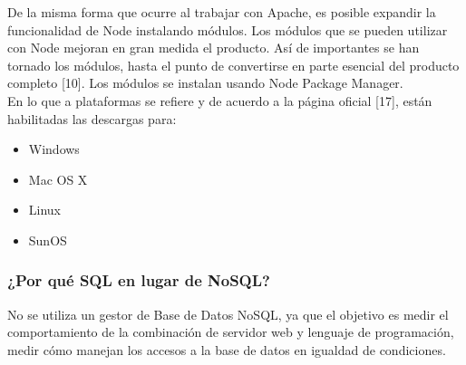 
De la misma forma que ocurre al trabajar con Apache, es posible expandir la funcionalidad de Node 
instalando módulos. Los módulos que se pueden utilizar con Node mejoran en gran medida el producto.
Así de importantes se han tornado los módulos, hasta el punto de convertirse en parte esencial del 
producto completo [10]. Los módulos se instalan usando Node Package Manager.\\

En lo que a plataformas se refiere y de acuerdo a la página oficial [17], están habilitadas las 
descargas para:
\begin{itemize}
 \item Windows
 \item Mac OS X
 \item Linux
 \item SunOS
\end{itemize}

\subsubsection{¿Por qué SQL en lugar de NoSQL?}
No se utiliza un gestor de Base de Datos NoSQL, ya que el objetivo es medir el comportamiento de
la combinación de servidor web y lenguaje de programación, medir cómo manejan los accesos a la base 
de datos en igualdad de condiciones.\\
\newpage


